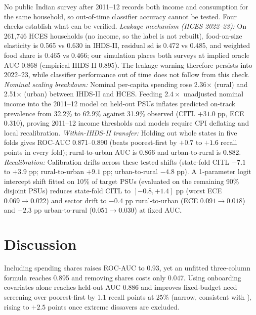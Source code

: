 \documentclass[conference]{IEEEtran}
\begin{document}
No public Indian survey after 2011--12 records both income and consumption for the same household, so out-of-time classifier accuracy cannot be tested. Four checks establish what can be verified. \emph{Leakage mechanism (HCES 2022--23):} On 261,746 HCES households \cite{hces} (no income, so the label is not rebuilt), food-on-size elasticity is 0.565 vs 0.630 in IHDS-II, residual sd is 0.472 vs 0.485, and weighted food share is 0.465 vs 0.466; our simulation places both surveys at implied oracle AUC 0.868 (empirical IHDS-II 0.895). The leakage warning therefore persists into 2022--23, while classifier performance out of time does not follow from this check. \emph{Nominal scaling breakdown:} Nominal per-capita spending rose 2.36$\times$ (rural) and 2.51$\times$ (urban) between IHDS-II and HCES. Feeding $2.4\times$ unadjusted nominal income into the 2011--12 model on held-out PSUs inflates predicted on-track prevalence from 32.2\% to 62.9\% against 31.9\% observed (CITL $+31.0$ pp, ECE 0.310), proving 2011--12 income thresholds and models require CPI deflating and local recalibration. \emph{Within-IHDS-II transfer:} Holding out whole states in five folds gives ROC-AUC 0.871--0.890 (beats poorest-first by $+0.7$ to $+1.6$ recall points in every fold); rural-to-urban AUC is 0.866 and urban-to-rural is 0.882. \emph{Recalibration:} Calibration drifts across these tested shifts (state-fold CITL $-7.1$ to $+3.9$ pp; rural-to-urban $+9.1$ pp; urban-to-rural $-4.8$ pp). A 1-parameter logit intercept shift fitted on 10\% of target PSUs (evaluated on the remaining 90\% disjoint PSUs) reduces state-fold CITL to $[-0.8, +1.4]$ pp (worst ECE $0.069 \to 0.022$) and sector drift to $-0.4$ pp rural-to-urban (ECE $0.091 \to 0.018$) and $-2.3$ pp urban-to-rural ($0.051 \to 0.030$) at fixed AUC.

\section{Discussion}

Including spending shares raises ROC-AUC to 0.93, yet an unfitted three-column formula reaches 0.895 and removing shares costs only 0.047. Using onboarding covariates alone reaches held-out AUC 0.886 and improves fixed-budget need screening over poorest-first by 1.1 recall points at 25\% (narrow, consistent with \cite{brown2018}), rising to $+2.5$ points once extreme dissavers are excluded.
\end{document}
